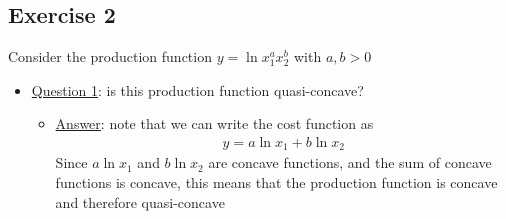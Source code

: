 \documentclass{article}
\begin{document}
\subsection{Exercise 2}
Consider the production function $y = \ln x_{1}^{a} x_{2}^{b}$ with $a,b > 0$ \par \vspace{0.3em}
  \begin{itemize}
    \item  \underline{Question 1}: is this production function quasi-concave?
    \begin{itemize}
      \item  \underline{Answer}: note that we can write the cost function as
      \begin{gather*}
        y = a \ln x_{1} + b \ln x_{2}
      \end{gather*}
      Since $a \ln x_{1}$ and $b \ln x_{2}$ are concave functions, and the sum of concave functions is concave, this means that the production function is concave and therefore quasi-concave
    \end{itemize}
  \end{itemize}
\end{document}
